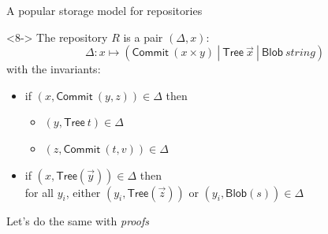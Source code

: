 \documentclass[ignorenonframetext,red]{beamer}
\newcommand\gor{\ |\ }
\begin{document}
\begin{frame}{A popular storage model for repositories}
\begin{onlyenv}
\begin{center}
    \end{center}
  \end{onlyenv}
  \begin{onlyenv}<8->
    The repository $R$ is a pair $(\Delta, x)$:
    \[ \Delta : x \mapsto (\mathsf{Commit}\ (x\times y) \gor \mathsf{Tree}\ \vec x
    \gor \mathsf{Blob}\ string)\]
    with the invariants:
    \begin{itemize}
    \item if $(x, \mathsf{Commit}\ (y,z)) \in\Delta$ then
      \begin{itemize}
      \item $(y, \mathsf{Tree}\ t)\in\Delta$
      \item $(z, \mathsf{Commit}\ (t,v))\in\Delta$
      \end{itemize}
    \item if $(x, \mathsf{Tree}(\vec y))\in\Delta$ then \\
      for all $y_i$, either $(y_i, \mathsf{Tree}(\vec z))$ or $(y_i,
      \mathsf{Blob}(s))\in\Delta$
    \end{itemize}
    \pause
    \begin{center}
      \vspace{4em} {\Large Let's do the same with \emph{proofs}}
     \end{center}
  \end{onlyenv}
\end{frame}
\end{document}
